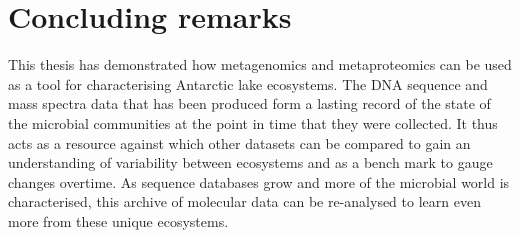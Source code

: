 \section{Concluding remarks}

This thesis has demonstrated how metagenomics and metaproteomics can be used as a tool for characterising Antarctic lake ecosystems.
The \textsc{DNA} sequence and mass spectra data that has been produced form a lasting record of the state of the microbial communities at the point in time that they were collected.
It thus acts as a resource against which other datasets can be compared to gain an understanding of variability between ecosystems and as a bench mark to gauge changes overtime.
As sequence databases grow and more of the microbial world is characterised, this archive of molecular data can be re-analysed to learn even more from these unique ecosystems.




